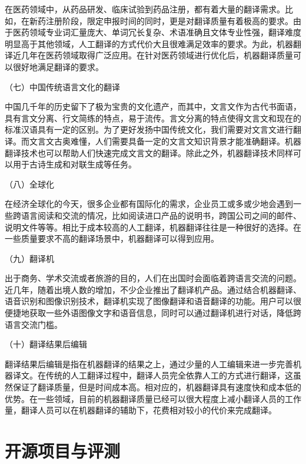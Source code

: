 \parinterval 在医药领域中，从药品研发、临床试验到药品注册，都有着大量的翻译需求。比如，在新药注册阶段，限定申报时间的同时，更是对翻译质量有着极高的要求。由于医药领域专业词汇量庞大、单词冗长复杂、术语准确且文体专业性强，翻译难度明显高于其他领域，人工翻译的方式代价大且很难满足效率的要求。为此，机器翻译近几年在医药领域取得广泛应用。在针对医药领域进行优化后，机器翻译质量可以很好地满足翻译的要求。

\parinterval （七）中国传统语言文化的翻译

\parinterval 中国几千年的历史留下了极为宝贵的文化遗产，而其中，文言文作为古代书面语，具有言文分离、行文简练的特点，易于流传。言文分离的特点使得文言文和现在的标准汉语具有一定的区别。为了更好发扬中国传统文化，我们需要对文言文进行翻译。而文言文古奥难懂，人们需要具备一定的文言文知识背景才能准确翻译。机器翻译技术也可以帮助人们快速完成文言文的翻译。除此之外，机器翻译技术同样可以用于古诗生成和对联生成等任务。

\parinterval （八）全球化

\parinterval 在经济全球化的今天，很多企业都有国际化的需求，企业员工或多或少地会遇到一些跨语言阅读和交流的情况，比如阅读进口产品的说明书，跨国公司之间的邮件、说明文件等等。相比于成本较高的人工翻译，机器翻译往往是一种很好的选择。在一些质量要求不高的翻译场景中，机器翻译可以得到应用。

\parinterval （九）翻译机

\parinterval 出于商务、学术交流或者旅游的目的，人们在出国时会面临着跨语言交流的问题。近几年，随着出境人数的增加，不少企业推出了翻译机产品。通过结合机器翻译、语音识别和图像识别技术，翻译机实现了图像翻译和语音翻译的功能。用户可以很便捷地获取一些外语图像文字和语音信息，同时可以通过翻译机进行对话，降低跨语言交流门槛。

\parinterval （十）翻译结果后编辑

\parinterval 翻译结果后编辑是指在机器翻译的结果之上，通过少量的人工编辑来进一步完善机器译文。在传统的人工翻译过程中，翻译人员完全依靠人工的方式进行翻译，这虽然保证了翻译质量，但是时间成本高。相对应的，机器翻译具有速度快和成本低的优势。在一些领域，目前的机器翻译质量已经可以很大程度上减小翻译人员的工作量，翻译人员可以在机器翻译的辅助下，花费相对较小的代价来完成翻译。


\sectionnewpage
\section{开源项目与评测}

